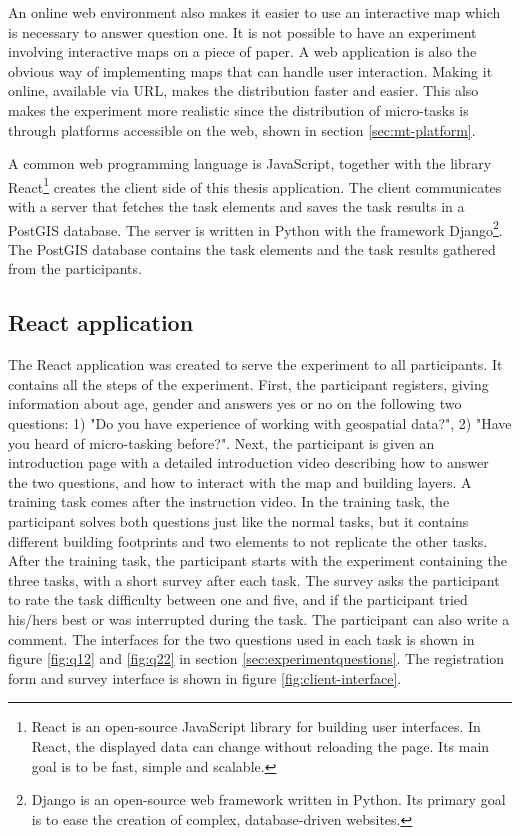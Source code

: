 An online web environment also makes it easier to use an interactive map which is necessary to answer question one. It is not possible to have an experiment involving interactive maps on a piece of paper. A web application is also the obvious way of implementing maps that can handle user interaction. Making it online, available via URL, makes the distribution faster and easier. This also makes the experiment more realistic since the distribution of micro-tasks is through platforms accessible on the web, shown in section \ref{sec:mt-platform}. 

A common web programming language is JavaScript, together with the library React\footnote{React is an open-source JavaScript library for building user interfaces. In React, the displayed data can change without reloading the page. Its main goal is to be fast, simple and scalable.} creates the client side of this thesis application. The client communicates with a server that fetches the task elements and saves the task results in a PostGIS database. The server is written in Python with the framework Django\footnote{Django is an open-source web framework written in Python. Its primary goal is to ease the creation of complex, database-driven websites.}. The PostGIS database contains the task elements and the task results gathered from the participants. 
 
\subsection{React application}
The React application was created to serve the experiment to all participants. It contains all the steps of the experiment. First, the participant registers, giving information about age, gender and answers yes or no on the following two questions: 1) "Do you have experience of working with geospatial data?", 2) "Have you heard of micro-tasking before?". Next, the participant is given an introduction page with a detailed introduction video describing how to answer the two questions, and how to interact with the map and building layers. A training task comes after the instruction video. In the training task, the participant solves both questions just like the normal tasks, but it contains different building footprints and two elements to not replicate the other tasks. After the training task, the participant starts with the experiment containing the three tasks, with a short survey after each task. The survey asks the participant to rate the task difficulty between one and five, and if the participant tried his/hers best or was interrupted during the task. The participant can also write a comment. The interfaces for the two questions used in each task is shown in figure \ref{fig:q12} and \ref{fig:q22} in section \ref{sec:experimentquestions}. The registration form and survey interface is shown in figure \ref{fig:client-interface}. 

